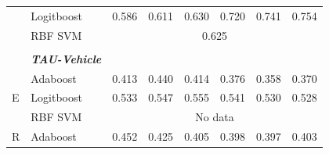\documentclass[12pt]{article}
\begin{document}
\begin{sloppypar}
\begin{table}
\begin{tabular}{lllllllll}
                                       & \multicolumn{2}{l}{Logitboost}                            & 0.586                           & 0.611                            & 0.630                            & 0.720                           & 0.741                            & 0.754                            \\
                                       & \multicolumn{2}{l}{RBF SVM}                               & \multicolumn{6}{c}{0.625}                                                                                                                                                                                     \\
                                       &                 &                                         &                                 &                                  &                                  &                                 &                                  &                                  \\
                                       & \multicolumn{2}{l}{\textit{\textbf{TAU-Vehicle}}}         &                                 &                                  &                                  &                                 &                                  &                                  \\
\multirow{3}{*}{E}                     & \multicolumn{2}{l}{Adaboost}                              & 0.413                           & 0.440                            & 0.414                            & 0.376                           & 0.358                            & 0.370                            \\
                                       & \multicolumn{2}{l}{Logitboost}                            & 0.533                           & 0.547                            & 0.555                            & 0.541                           & 0.530                            & 0.528                            \\
                                       & \multicolumn{2}{l}{RBF SVM}                               & \multicolumn{6}{c}{No data}                                                                                                                                                                                   \\
\multirow{3}{*}{R}                     & \multicolumn{2}{l}{Adaboost}                              & 0.452                           & 0.425                            & 0.405                            & 0.398                           & 0.397                            & 0.403                            \\

\end{tabular}
\end{table}
\end{sloppypar}
\end{document}
